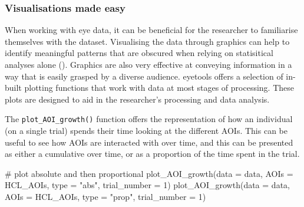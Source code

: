 \documentclass[
  man,
  floatsintext,
  longtable,
  nolmodern,
  notxfonts,
  notimes,
  colorlinks=true,linkcolor=blue,citecolor=blue,urlcolor=blue]{apa7}
\newenvironment{Shaded}{\begin{snugshade}}{\end{snugshade}}
\newcommand{\AttributeTok}[1]{\textcolor[rgb]{0.40,0.45,0.13}{#1}}
\newcommand{\CommentTok}[1]{\textcolor[rgb]{0.37,0.37,0.37}{#1}}
\newcommand{\DecValTok}[1]{\textcolor[rgb]{0.68,0.00,0.00}{#1}}
\newcommand{\FunctionTok}[1]{\textcolor[rgb]{0.28,0.35,0.67}{#1}}
\newcommand{\NormalTok}[1]{\textcolor[rgb]{0.00,0.23,0.31}{#1}}
\newcommand{\StringTok}[1]{\textcolor[rgb]{0.13,0.47,0.30}{#1}}
\begin{document}
\subsubsection{Visualisations made easy}\label{visualisations-made-easy}

When working with eye data, it can be beneficial for the researcher to
familiarise themselves with the dataset. Visualising the data through
graphics can help to identify meaningful patterns that are obscured when
relying on statisitical analyses alone
().
Graphics are also very effective at conveying information in a way that
is easily grasped by a diverse audience. eyetools offers a selection of
in-built plotting functions that work with data at most stages of
processing. These plots are designed to aid in the researcher's
processing and data analysis.

The \texttt{plot\_AOI\_growth()} function offers the representation of
how an individual (on a single trial) spends their time looking at the
different AOIs. This can be useful to see how AOIs are interacted with
over time, and this can be presented as either a cumulative over time,
or as a proportion of the time spent in the trial.

\begin{Shaded}
\begin{Highlighting}[]
\CommentTok{\# plot absolute and then proportional}
\FunctionTok{plot\_AOI\_growth}\NormalTok{(}\AttributeTok{data =}\NormalTok{ data, }
                \AttributeTok{AOIs =}\NormalTok{ HCL\_AOIs, }
                \AttributeTok{type =} \StringTok{"abs"}\NormalTok{, }
                \AttributeTok{trial\_number =} \DecValTok{1}\NormalTok{)}
\FunctionTok{plot\_AOI\_growth}\NormalTok{(}\AttributeTok{data =}\NormalTok{ data, }
                \AttributeTok{AOIs =}\NormalTok{ HCL\_AOIs, }
                \AttributeTok{type =} \StringTok{"prop"}\NormalTok{, }
                \AttributeTok{trial\_number =} \DecValTok{1}\NormalTok{)}
\end{Highlighting}
\end{Shaded}
\end{document}
